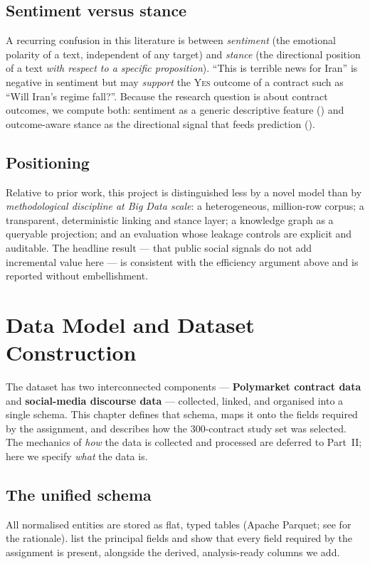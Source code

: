 \section{Sentiment versus stance}
A recurring confusion in this literature is between \emph{sentiment} (the emotional
polarity of a text, independent of any target) and \emph{stance} (the directional
position of a text \emph{with respect to a specific proposition}). ``This is
terrible news for Iran'' is negative in sentiment but may \emph{support} the
\textsc{Yes} outcome of a contract such as ``Will Iran's regime fall?''. Because the
research question is about contract outcomes, we compute both: sentiment as a generic
descriptive feature () and outcome-aware stance as the directional
signal that feeds prediction ().

\section{Positioning}
Relative to prior work, this project is distinguished less by a novel model than by
\emph{methodological discipline at Big Data scale}: a heterogeneous,
million-row corpus; a transparent, deterministic linking and stance layer; a knowledge
graph as a queryable projection; and an evaluation whose leakage controls are explicit
and auditable. The headline result --- that public social signals do not add
incremental value here --- is consistent with the efficiency argument above and is
reported without embellishment.


\chapter{Data Model and Dataset Construction}
\label{ch:data}

The dataset has two interconnected components --- \textbf{Polymarket contract data}
and \textbf{social-media discourse data} --- collected, linked, and organised into a
single schema. This chapter defines that schema, maps it onto the fields required by
the assignment, and describes how the 300-contract study set was selected. The
mechanics of \emph{how} the data is collected and processed are deferred to
Part~II; here we specify \emph{what} the data is.

\section{The unified schema}
\label{sec:schema}
All normalised entities are stored as flat, typed tables (Apache Parquet; see
 for the rationale). 
list the principal fields and show that every field required by the assignment is
present, alongside the derived, analysis-ready columns we add.


